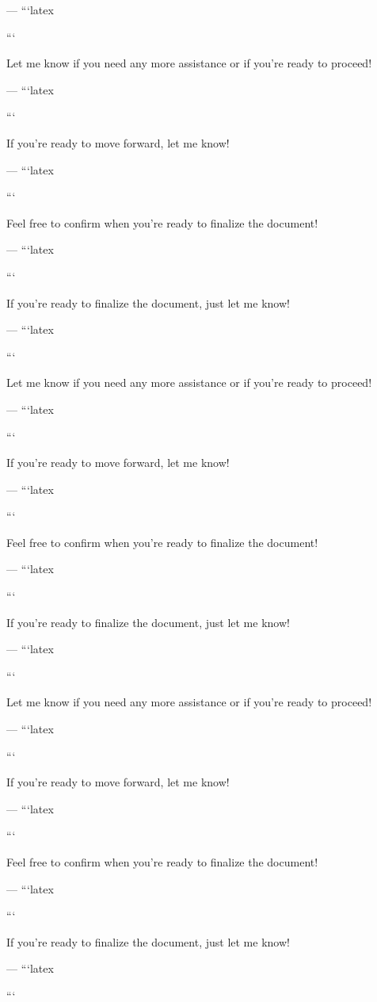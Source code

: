 --- 
```latex


``` 

Let me know if you need any more assistance or if you're ready to proceed! 

--- 
```latex


``` 

If you're ready to move forward, let me know! 

--- 
```latex


``` 

Feel free to confirm when you're ready to finalize the document! 

--- 
```latex


``` 

If you're ready to finalize the document, just let me know! 

--- 
```latex


``` 

Let me know if you need any more assistance or if you're ready to proceed! 

--- 
```latex


``` 

If you're ready to move forward, let me know! 

--- 
```latex


``` 

Feel free to confirm when you're ready to finalize the document! 

--- 
```latex


``` 

If you're ready to finalize the document, just let me know! 

--- 
```latex


``` 

Let me know if you need any more assistance or if you're ready to proceed! 

--- 
```latex


``` 

If you're ready to move forward, let me know! 

--- 
```latex


``` 

Feel free to confirm when you're ready to finalize the document! 

--- 
```latex


``` 

If you're ready to finalize the document, just let me know! 

--- 
```latex


``` 

